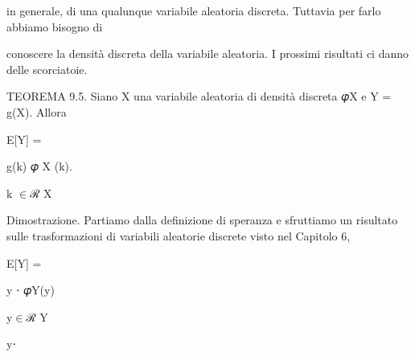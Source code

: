 \documentclass[a4paper,portrait,12pt]{article}
\begin{document}
\begin{flushleft}
in generale, di una qualunque variabile aleatoria discreta. Tuttavia per farlo abbiamo bisogno di
\end{flushleft}


\begin{flushleft}
conoscere la densit\`{a} discreta della variabile aleatoria. I prossimi risultati ci danno delle scorciatoie.
\end{flushleft}


\begin{flushleft}
TEOREMA 9.5. Siano X una variabile aleatoria di densit\`{a} discreta 𝜑X e Y = g(X). Allora
\end{flushleft}


\begin{flushleft}
E[Y] =
\end{flushleft}





\begin{flushleft}
g(k) 𝜑 X (k).
\end{flushleft}


\begin{flushleft}
k $\in$ℛ X
\end{flushleft}





\begin{flushleft}
Dimostrazione. Partiamo dalla definizione di speranza e sfruttiamo un risultato sulle trasformazioni di variabili aleatorie discrete visto nel Capitolo 6,
\end{flushleft}


\begin{flushleft}
E[Y] =
\end{flushleft}





\begin{flushleft}
y ⋅ 𝜑Y(y)
\end{flushleft}


\begin{flushleft}
y$\in$ℛ Y
\end{flushleft}





\begin{flushleft}
y⋅
\end{flushleft}
\end{document}
